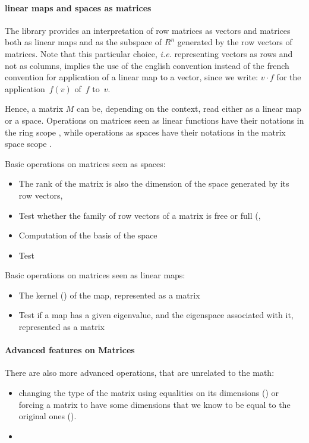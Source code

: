 \paragraph{linear maps and spaces as matrices}

The library  provides an interpretation of row
matrices as vectors and matrices both as linear maps and as the
subspace of $R^n$ generated by the row vectors of matrices. Note that
this particular choice, \textit{i.e.} representing vectors as rows and
not as columns, implies the use of the english convention instead of
the french convention for application of a linear map to a
vector, since we write: $v \cdot f$ for the application~$f(v)$ of~$f$
to~$v$.

Hence, a matrix $M$ can be, depending on the context, read either as a
linear map or a space. Operations on matrices seen as linear
functions have their notations in the ring scope , while
operations as spaces have their notations in the matrix space scope
.

Basic operations on matrices seen as spaces:
\begin{itemize}
\item The rank of the matrix is also the dimension of the space
  generated by its row vectors, 
\item Test whether the family of row vectors of a matrix is free or
  full (, 
\item Computation of the basis of the space
\item Test
\end{itemize}

Basic operations on matrices seen as linear maps:
\begin{itemize}
\item The kernel () of the map, represented as a matrix
\item Test if a map has a given eigenvalue, and the eigenspace
  associated with it, represented as a matrix
\end{itemize}


\paragraph{Advanced features on Matrices}

There are also more advanced operations, that are unrelated to the
math:
\begin{itemize}
\item changing the type of the matrix using equalities on its
  dimensions () or forcing a matrix to have some dimensions
  that we know to be equal to the original ones ().
\item 
\end{itemize}

